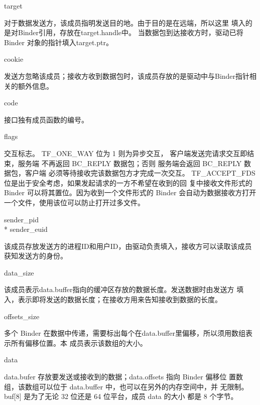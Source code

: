\documentclass[a4paper,11pt]{article}
\begin{document}
\begin{itemize*}
    \item  target

        对于数据发送方，该成员指明发送目的地。由于目的是在远端，所以这里
        填入的是对Binder引用，存放在target.handle中。
        当数据包到达接收方时，驱动已将 Binder 对象的指针填入target.ptr。

    \item cookie

        发送方忽略该成员；接收方收到数据包时，该成员存放的是驱动中与Binder指针相关的额外信息。

    \item code

        接口独有成员函数的编号。

    \item flags\label{BinderInteractionFlag}

          交互标志。
           TF_ONE_WAY 位为 1 则为异步交互， 客户端发送完请求交互即结束，服务端
           不再返回 BC_REPLY 数据包；否则 服务端会返回 BC_REPLY 数据包，客户端
           必须等待接收完该数据包方才完成一次交互。
           TF_ACCEPT_FDS 位是出于安全考虑，如果发起请求的一方不希望在收到的回
           复中接收文件形式的 Binder 可以将其置位。因为收到一个文件形式的
           Binder 会自动为数据接收方打开一个文件，使用该位可以防止打开过多文件。

      \item sender_pid\\* sender_euid

          该成员存放发送方的进程ID和用户ID，由驱动负责填入，接收方可以读取该成员获知发送方的身份。

      \item data_size

          该成员表示data.buffer指向的缓冲区存放的数据长度。发送数据时由发送方
          填入，表示即将发送的数据长度；在接收方用来告知接收到数据的长度。

      \item offsets_size

          多个 Binder 在数据中传递，需要标出每个在data.buffer里偏移，所以须用数组表示所有偏移位置。本
          成员表示该数组的大小。

      \item data

          data.bufer 存放要发送或接收到的数据；data.offsets 指向 Binder 偏移位
          置数组，该数组可以位于 data.buffer 中，也可以在另外的内存空间中，并
          无限制。buf[8] 是为了无论 32 位还是 64 位平台，成员 data 的大小
          都是 8 个字节。

\end{itemize*}
\end{document}
